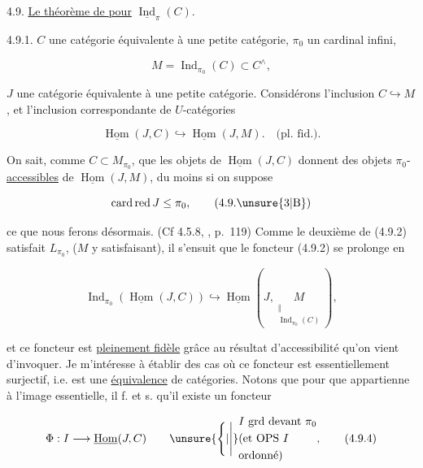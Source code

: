 
4.9. \uline{Le théorème de } \uline{pour} $\underline{\operatorname{Ind}}_{\pi}(C)$.

4.9.1.  $C$ une catégorie équivalente à une petite catégorie, $\pi_0$ un cardinal infini,

\[
M=\operatorname{Ind}_{\pi_0}(C)\subset C^\wedge,\tag*{(4.9.1)}
\]

$J$ une catégorie équivalente à une petite catégorie. Considérons l'inclusion  $C\hookrightarrow M$, et l'inclusion correspondante de $U$-catégories

\[
\underline{\operatorname{Hom}}(J,C)\hookrightarrow\underline{\operatorname{Hom}}(J,M).\quad\text{(pl. fid.)}.\tag*{(4.9.2)}
\]

On sait,  comme $C\subset M_{\pi_0}$, que les objets de $\underline{\operatorname{Hom}}(J,C)$ donnent des objets $\pi_0$-\uline{accessibles} de  $\underline{\operatorname{Hom}}(J,M)$, du moins si on suppose

\[
\operatorname{card}\operatorname{red}J\leq\pi_0,\tag*{(4.9.\unsure{3|B})}
\]

ce que nous ferons désormais. (Cf 4.5.8, , p.~119) Comme le deuxième  de (4.9.2) satisfait $L_{\pi_0}$, ($M$ y satisfaisant), il s'ensuit que  le foncteur (4.9.2) se prolonge en

\[
\operatorname{Ind}_{\pi_0}(\underline{\operatorname{Hom}}(J,C))\hookrightarrow\underline{\operatorname{Hom}}(J,\underset{\substack{\Vert\\ \operatorname{Ind}_{\pi_0}(C)}}{M}),\tag*{(4.9.3)}
\]

et ce foncteur est \uline{pleinement fidèle} grâce au résultat d'accessibilité qu'on vient d'invoquer. Je m'intéresse à établir des cas où ce foncteur est essentiellement surjectif, i.e. est une \uline{équivalence} de catégories. Notons que pour que  appartienne à l'image essentielle, il f. et s. qu'il existe un foncteur

\[
\Phi:I\longrightarrow\underline{\operatorname{Hom}}(J,C)\qquad\unsure{\Biggl\lbrace|\Biggl\vert}\begin{aligned}&I\ \text{grd devant }\pi_0\\ &\text{(et OPS }I\ \\&\text{ordonné)}\end{aligned},\tag*{(4.9.4)}
\]

